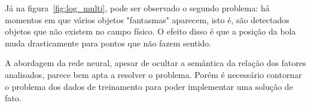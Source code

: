 Já na figura~\ref{fig:log_multi}, pode ser observado o segundo problema: há
momentos em que vários objetos "fantasmas" aparecem, isto é, são detectados
objetos que não existem no campo físico. O efeito disso é que a posição da bola
muda drasticamente para pontos que não fazem sentido.

A abordagem da rede neural, apesar de ocultar a semântica da relação dos fatores
analisados, parece bem apta a resolver o problema. Porém é necessário contornar
o problema dos dados de treinamento para poder implementar uma solução de fato.

